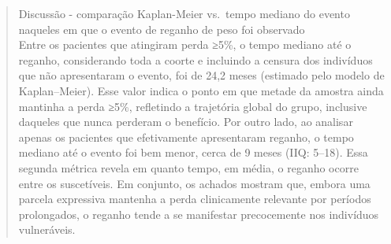 \documentclass[
]{article}
\begin{document}
\begin{quote}
Discussão - comparação Kaplan-Meier vs.~tempo mediano do evento naqueles
em que o evento de reganho de peso foi observado\\
Entre os pacientes que atingiram perda ≥5\%, o tempo mediano até o
reganho, considerando toda a coorte e incluindo a censura dos indivíduos
que não apresentaram o evento, foi de 24,2 meses (estimado pelo modelo
de Kaplan--Meier). Esse valor indica o ponto em que metade da amostra
ainda mantinha a perda ≥5\%, refletindo a trajetória global do grupo,
inclusive daqueles que nunca perderam o benefício. Por outro lado, ao
analisar apenas os pacientes que efetivamente apresentaram reganho, o
tempo mediano até o evento foi bem menor, cerca de 9 meses (IIQ: 5--18).
Essa segunda métrica revela em quanto tempo, em média, o reganho ocorre
entre os suscetíveis. Em conjunto, os achados mostram que, embora uma
parcela expressiva mantenha a perda clinicamente relevante por períodos
prolongados, o reganho tende a se manifestar precocemente nos indivíduos
vulneráveis.\\
\end{quote}
\end{document}
